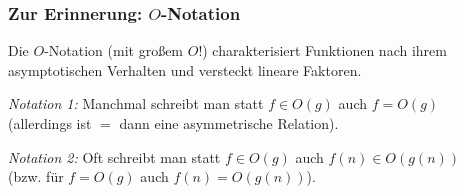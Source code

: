 \documentclass[aspectratio=1610,onlymath]{beamer}
\begin{document}
\begin{frame}\frametitle{Zur Erinnerung: $O$-Notation}

Die $O$-Notation (mit großem $O$!) charakterisiert Funktionen nach ihrem asymptotischen Verhalten und
versteckt lineare Faktoren.

\pause

\emph{Notation 1:} Manchmal schreibt man statt $f\in O(g)$ auch $f=O(g)$\\ (allerdings ist $=$ dann eine
asymmetrische Relation).\medskip

\emph{Notation 2:} Oft schreibt man statt $f\in O(g)$ auch $f(n)\in O(g(n))$\\ (bzw. für $f=O(g)$ auch $f(n)=O(g(n))$).


\end{frame}
\end{document}
